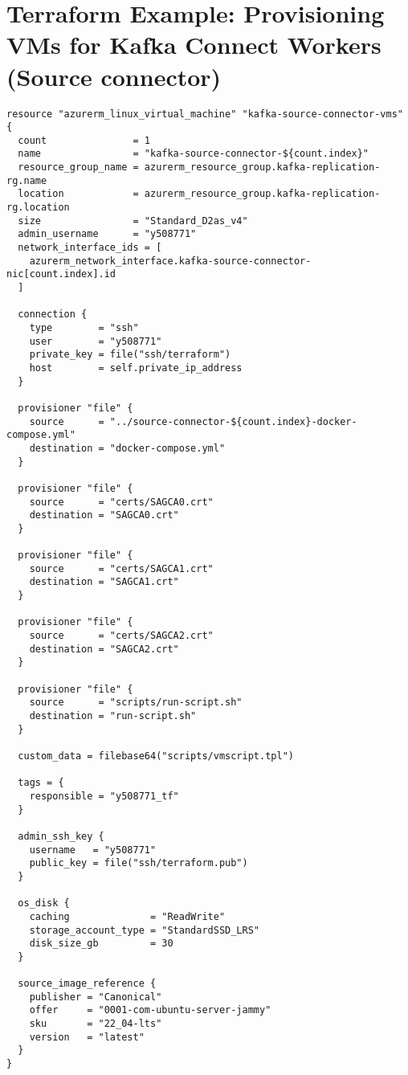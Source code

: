 \section{Terraform Example: Provisioning VMs for Kafka Connect Workers (Source connector)}
\begin{lstlisting}[frame=tb,caption={Terraform script sample},label=lst:terraform]
resource "azurerm_linux_virtual_machine" "kafka-source-connector-vms" {
  count               = 1
  name                = "kafka-source-connector-${count.index}"
  resource_group_name = azurerm_resource_group.kafka-replication-rg.name
  location            = azurerm_resource_group.kafka-replication-rg.location
  size                = "Standard_D2as_v4"
  admin_username      = "y508771"
  network_interface_ids = [
    azurerm_network_interface.kafka-source-connector-nic[count.index].id
  ]

  connection {
    type        = "ssh"
    user        = "y508771"
    private_key = file("ssh/terraform")
    host        = self.private_ip_address
  }

  provisioner "file" {
    source      = "../source-connector-${count.index}-docker-compose.yml"
    destination = "docker-compose.yml"
  }

  provisioner "file" {
    source      = "certs/SAGCA0.crt"
    destination = "SAGCA0.crt"
  }

  provisioner "file" {
    source      = "certs/SAGCA1.crt"
    destination = "SAGCA1.crt"
  }

  provisioner "file" {
    source      = "certs/SAGCA2.crt"
    destination = "SAGCA2.crt"
  }

  provisioner "file" {
    source      = "scripts/run-script.sh"
    destination = "run-script.sh"
  }

  custom_data = filebase64("scripts/vmscript.tpl")

  tags = {
    responsible = "y508771_tf"
  }

  admin_ssh_key {
    username   = "y508771"
    public_key = file("ssh/terraform.pub")
  }

  os_disk {
    caching              = "ReadWrite"
    storage_account_type = "StandardSSD_LRS"
    disk_size_gb         = 30
  }

  source_image_reference {
    publisher = "Canonical"
    offer     = "0001-com-ubuntu-server-jammy"
    sku       = "22_04-lts"
    version   = "latest"
  }
}
\end{lstlisting}
